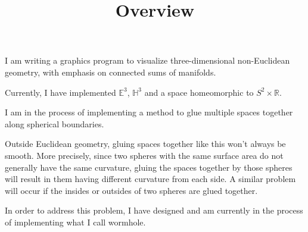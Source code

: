 \documentclass[12pt]{amsart}
\begin{document}
\title{Overview}
\maketitle

I am writing a graphics program to visualize three-dimensional non-Euclidean geometry, with emphasis on connected sums of manifolds.

Currently, I have implemented $\mathbb{E}^3$, $\mathbb{H}^3$ and a space homeomorphic to $S^2 \times \mathbb{R}$.

I am in the process of implementing a method to glue multiple spaces together along spherical boundaries.

Outside Euclidean geometry, gluing spaces together like this won't always be smooth. More precisely, since two spheres with the same surface area do not generally have the same curvature, gluing the spaces together by those spheres will result in them having different curvature from each side. A similar problem will occur if the insides or outsides of two spheres are glued together.

In order to address this problem, I have designed and am currently in the process of implementing what I call wormhole.
\end{document}
